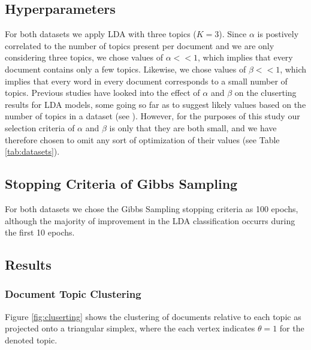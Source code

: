 \documentclass[10pt]{article}
\begin{document}
%
%
\subsection{Hyperparameters}
For both datasets we apply LDA with three topics ($K = 3$). Since $\alpha$ is postively correlated to the number of topics present per document and we are only considering three topics, we chose values of $\alpha << 1$, which implies that every document contains only a few topics. Likewise, we chose values of $\beta << 1$, which implies that every word in every document corresponds to a small number of topics. Previous studies have looked into the effect of $\alpha$ and $\beta$ on the cluserting results for LDA models, some going so far as to suggest likely values based on the number of topics in a dataset (see \cite{Griffiths2004}). However, for the purposes of this study our selection criteria of $\alpha$ and $\beta$ is only that they are both small, and we have therefore chosen to omit any sort of optimization of their values (see Table \ref{tab:datasets}).


%
%
\subsection{Stopping Criteria of Gibbs Sampling}
For both datasets we chose the Gibbs Sampling stopping criteria as 100 epochs, although the majority of improvement in the LDA classification occurrs during the first 10 epochs.


%
%
\subsection{Results}

\subsubsection{Document Topic Clustering}
Figure \ref{fig:cluserting} shows the clustering of documents relative to each topic as projected onto a triangular simplex, where the each vertex indicates $\theta = 1$ for the denoted topic.
\end{document}
